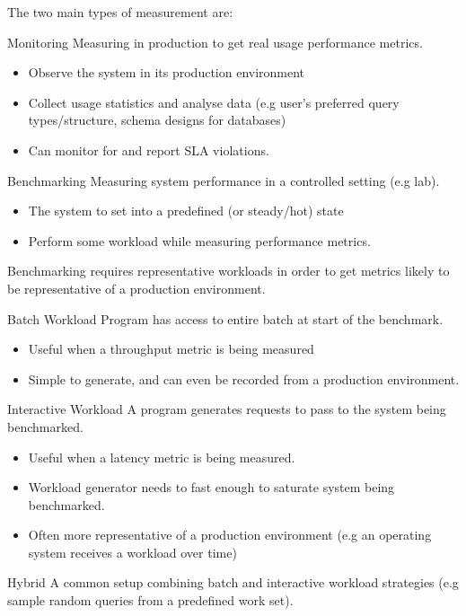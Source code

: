 The two main types of measurement are:
\begin{tcbraster}[raster columns=2,raster equal height]
\begin{definitionbox}{Monitoring}
    Measuring in production to get real usage performance metrics.
    \begin{itemize}
        \item Observe the system in its production environment
        \item Collect usage statistics and analyse data (e.g user's preferred query types/structure, schema designs for databases)
        \item Can monitor for and report SLA violations.
    \end{itemize}
\end{definitionbox}
\begin{definitionbox}{Benchmarking}
    Measuring system performance in a controlled setting (e.g lab).
    \begin{itemize}
        \item The system to set into a predefined (or steady/hot) state
        \item Perform some workload while measuring performance metrics.
    \end{itemize}
\end{definitionbox}
\end{tcbraster}
Benchmarking requires representative workloads in order to get metrics likely to be representative of a production environment.
\begin{definitionbox}{Batch Workload}
    Program has access to entire batch at start of the benchmark.
    \begin{itemize}
        \item Useful when a throughput metric is being measured
        \item Simple to generate, and can even be recorded from a production environment.
    \end{itemize}
\end{definitionbox}
\begin{definitionbox}{Interactive Workload}
    A program generates requests to pass to the system being benchmarked.
    \begin{itemize}
        \item Useful when a latency metric is being measured.
        \item Workload generator needs to fast enough to saturate system being benchmarked.
        \item Often more representative of a production environment (e.g an operating system receives a workload over time)
    \end{itemize}
\end{definitionbox}
\begin{definitionbox}{Hybrid}
    A common setup combining batch and interactive workload strategies (e.g sample random queries from a predefined work set).
\end{definitionbox}

